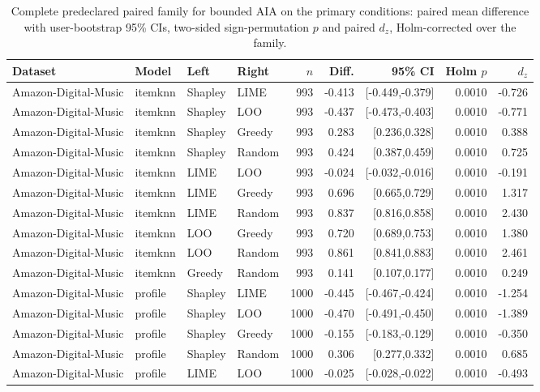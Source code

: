 \begin{table}[t]\centering\scriptsize\setlength{\tabcolsep}{3pt}
\caption{Complete predeclared paired family for bounded AIA on the primary
conditions: paired mean difference with user-bootstrap 95\% CIs, two-sided
sign-permutation $p$ and paired $d_z$, Holm-corrected over the family.}
\label{tab:paired-full}
\begin{tabular}{@{}llllrrrrr@{}}
\toprule
Dataset & Model & Left & Right & $n$ & Diff. & 95\% CI & Holm $p$ & $d_z$ \\
\midrule
Amazon-Digital-Music & itemknn & Shapley & LIME & 993 & -0.413 & [-0.449,-0.379] & 0.0010 & -0.726 \\
Amazon-Digital-Music & itemknn & Shapley & LOO & 993 & -0.437 & [-0.473,-0.403] & 0.0010 & -0.771 \\
Amazon-Digital-Music & itemknn & Shapley & Greedy & 993 & 0.283 & [0.236,0.328] & 0.0010 & 0.388 \\
Amazon-Digital-Music & itemknn & Shapley & Random & 993 & 0.424 & [0.387,0.459] & 0.0010 & 0.725 \\
Amazon-Digital-Music & itemknn & LIME & LOO & 993 & -0.024 & [-0.032,-0.016] & 0.0010 & -0.191 \\
Amazon-Digital-Music & itemknn & LIME & Greedy & 993 & 0.696 & [0.665,0.729] & 0.0010 & 1.317 \\
Amazon-Digital-Music & itemknn & LIME & Random & 993 & 0.837 & [0.816,0.858] & 0.0010 & 2.430 \\
Amazon-Digital-Music & itemknn & LOO & Greedy & 993 & 0.720 & [0.689,0.753] & 0.0010 & 1.380 \\
Amazon-Digital-Music & itemknn & LOO & Random & 993 & 0.861 & [0.841,0.883] & 0.0010 & 2.461 \\
Amazon-Digital-Music & itemknn & Greedy & Random & 993 & 0.141 & [0.107,0.177] & 0.0010 & 0.249 \\
Amazon-Digital-Music & profile & Shapley & LIME & 1000 & -0.445 & [-0.467,-0.424] & 0.0010 & -1.254 \\
Amazon-Digital-Music & profile & Shapley & LOO & 1000 & -0.470 & [-0.491,-0.450] & 0.0010 & -1.389 \\
Amazon-Digital-Music & profile & Shapley & Greedy & 1000 & -0.155 & [-0.183,-0.129] & 0.0010 & -0.350 \\
Amazon-Digital-Music & profile & Shapley & Random & 1000 & 0.306 & [0.277,0.332] & 0.0010 & 0.685 \\
Amazon-Digital-Music & profile & LIME & LOO & 1000 & -0.025 & [-0.028,-0.022] & 0.0010 & -0.493 \\

\end{tabular}
\end{table}
